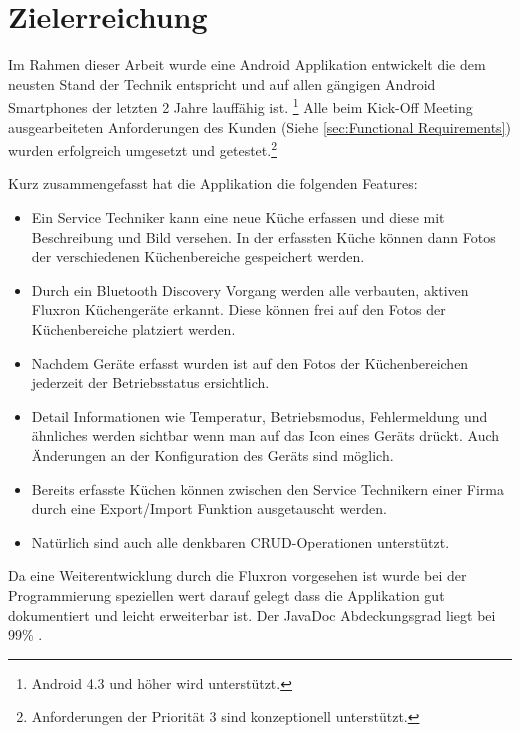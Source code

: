 \section{Zielerreichung}

Im Rahmen dieser Arbeit wurde eine Android Applikation entwickelt die dem neusten Stand der Technik entspricht und auf allen gängigen Android Smartphones der letzten 2 Jahre lauffähig ist. \footnote{Android 4.3 und höher wird unterstützt.} Alle beim Kick-Off Meeting ausgearbeiteten Anforderungen des Kunden (Siehe \ref{sec:Functional Requirements}) wurden erfolgreich umgesetzt und getestet.\footnote{Anforderungen der Priorität 3 sind konzeptionell unterstützt.}

Kurz zusammengefasst hat die Applikation die folgenden Features:

\begin{itemize}
\item Ein Service Techniker kann eine neue Küche erfassen und diese mit Beschreibung und Bild versehen. In der erfassten Küche können dann Fotos der verschiedenen Küchenbereiche gespeichert werden. 
\item Durch ein Bluetooth Discovery Vorgang werden alle verbauten, aktiven Fluxron Küchengeräte erkannt. Diese können frei auf den Fotos der Küchenbereiche platziert werden.
\item Nachdem Geräte erfasst wurden ist auf den Fotos der Küchenbereichen jederzeit der Betriebsstatus ersichtlich. 
\item Detail Informationen wie Temperatur, Betriebsmodus, Fehlermeldung und ähnliches werden sichtbar wenn man auf das Icon eines Geräts drückt. Auch Änderungen an der Konfiguration des Geräts sind möglich.
\item Bereits erfasste Küchen können zwischen den Service Technikern einer Firma durch eine Export/Import Funktion ausgetauscht werden.
\item Natürlich sind auch alle denkbaren \ac{CRUD}-Operationen unterstützt.
\end{itemize}

Da eine Weiterentwicklung durch die Fluxron vorgesehen ist wurde bei der Programmierung speziellen wert darauf gelegt dass die Applikation gut dokumentiert und leicht erweiterbar ist. Der JavaDoc Abdeckungsgrad liegt bei 99\% .